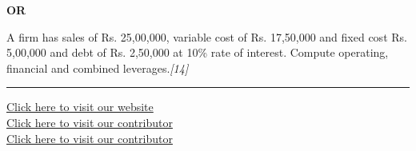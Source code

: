 \documentclass[11pt,a4paper]{article}
\newcommand{\pts}[1]{\hfill   \textit{[#1]}}
\begin{document}
\centerline{   \textbf{OR}}

A firm has sales of Rs. 25,00,000, variable cost of Rs. 17,50,000 and fixed cost Rs. 5,00,000 and debt of Rs. 2,50,000 at 10\% rate of interest. Compute operating, financial and combined leverages.\pts{14}

\vfill
\rule{\linewidth}{0.4pt}

\begin{center}\small
\href{https://bhu-exam.vercel.app/}{Click here to visit our website}\\[4pt]
\href{https://me-aryan.vercel.app/}{Click here to visit our contributor}\\[4pt]
\href{https://quashan-me.vercel.app/}{Click here to visit our contributor}
\end{center}
\end{document}
